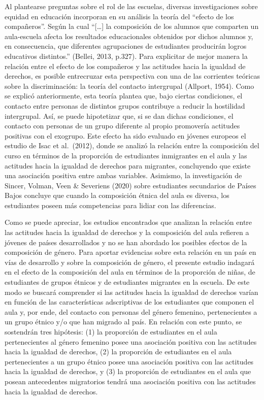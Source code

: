 \documentclass[12pt,twoside]{templates/facsothesis}
\begin{document}
Al plantearse preguntas sobre el rol de las escuelas, diversas investigaciones sobre equidad en educación incorporan en su análisis la teoría del ``efecto de los compañeros''. Según la cual ``{[}\ldots{]} la composición de los alumnos que comparten un aula-escuela afecta los resultados educacionales obtenidos por dichos alumnos y, en consecuencia, que diferentes agrupaciones de estudiantes producirán logros educativos distintos.'' (Bellei, 2013, p.327). Para explicitar de mejor manera la relación entre el efecto de los compañeros y las actitudes hacia la igualdad de derechos, es posible entrecruzar esta perspectiva con una de las corrientes teóricas sobre la discriminación: la teoría del contacto intergrupal (Allport, 1954). Como se explicó anteriormente, esta teoría plantea que, bajo ciertas condiciones, el contacto entre personas de distintos grupos contribuye a reducir la hostilidad intergrupal. Así, se puede hipotetizar que, si se dan dichas condiciones, el contacto con personas de un grupo diferente al propio promovería actitudes positivas con el exogrupo. Este efecto ha sido evaluado en jóvenes europeos el estudio de Isac et al.~(2012), donde se analizó la relación entre la composición del curso en términos de la proporción de estudiantes inmigrantes en el aula y las actitudes hacia la igualdad de derechos para migrantes, concluyendo que existe una asociación positiva entre ambas variables. Asimismo, la investigación de Sincer, Volman, Veen \& Severiens (2020) sobre estudiantes secundarios de Países Bajos concluye que cuando la composición étnica del aula es diversa, los estudiantes poseen más competencias para lidiar con las diferencias.

Como se puede apreciar, los estudios encontrados que analizan la relación entre las actitudes hacia la igualdad de derechos y la composición del aula refieren a jóvenes de países desarrollados y no se han abordado los posibles efectos de la composición de género. Para aportar evidencias sobre esta relación en un país en vías de desarrollo y sobre la composición de género, el presente estudio indagará en el efecto de la composición del aula en términos de la proporción de niñas, de estudiantes de grupos étnicos y de estudiantes migrantes en la escuela. De este modo se buscará comprender si las actitudes hacia la igualdad de derechos varían en función de las características adscriptivas de los estudiantes que componen el aula y, por ende, del contacto con personas del género femenino, pertenecientes a un grupo étnico y/o que han migrado al país. En relación con este punto, se sostendrán tres hipótesis: (1) la proporción de estudiantes en el aula pertenecientes al género femenino posee una asociación positiva con las actitudes hacia la igualdad de derechos, (2) la proporción de estudiantes en el aula pertenecientes a un grupo étnico posee una asociación positiva con las actitudes hacia la igualdad de derechos, y (3) la proporción de estudiantes en el aula que posean antecedentes migratorios tendrá una asociación positiva con las actitudes hacia la igualdad de derechos.
\end{document}
